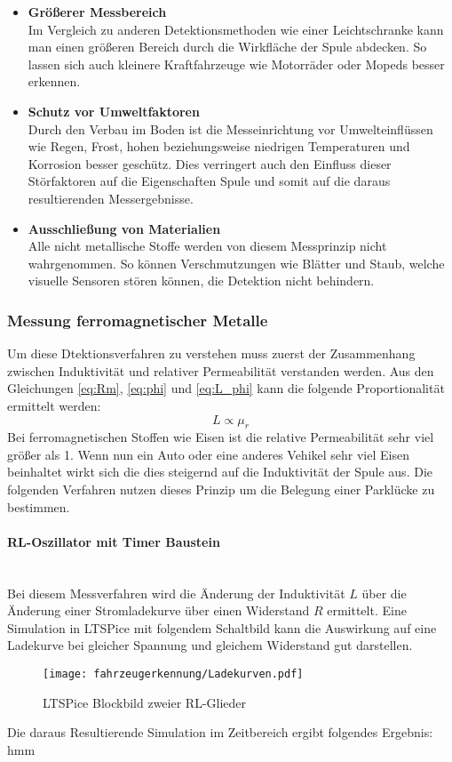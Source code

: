\begin{itemize}
    \item \textbf{Größerer Messbereich} \\
    Im Vergleich zu anderen Detektionsmethoden wie einer Leichtschranke kann man einen größeren Bereich durch die Wirkfläche
    der Spule abdecken. So lassen sich auch kleinere Kraftfahrzeuge wie Motorräder oder Mopeds besser erkennen.
    \item \textbf{Schutz vor Umweltfaktoren} \\
    Durch den Verbau im Boden ist die Messeinrichtung vor Umwelteinflüssen wie Regen, Frost, hohen beziehungsweise
    niedrigen Temperaturen und Korrosion besser geschütz. Dies verringert auch den Einfluss dieser Störfaktoren auf die Eigenschaften
    Spule und somit auf die daraus resultierenden Messergebnisse.
    \item \textbf{Ausschließung von Materialien} \\
    Alle nicht metallische Stoffe werden von diesem Messprinzip nicht wahrgenommen. So können Verschmutzungen wie Blätter und Staub, welche
    visuelle Sensoren stören können, die Detektion nicht behindern.
    
\end{itemize}
\subsubsection{Messung ferromagnetischer Metalle}
Um diese Dtektionsverfahren zu verstehen muss zuerst der Zusammenhang zwischen Induktivität und relativer Permeabilität verstanden werden.
Aus den Gleichungen \ref{eq:Rm}, \ref{eq:phi} und \ref{eq:L_phi} kann die folgende Proportionalität ermittelt werden:
\begin{equation} \label{iq:L_mu}
    L \propto \mu_{r}
\end{equation}
Bei ferromagnetischen Stoffen wie Eisen ist die relative Permeabilität sehr viel größer als 1. Wenn nun ein Auto oder 
eine anderes Vehikel sehr viel Eisen beinhaltet wirkt sich die dies steigernd auf die Induktivität der Spule aus. Die folgenden
Verfahren nutzen dieses Prinzip um die Belegung einer Parklücke zu bestimmen.

\paragraph{RL-Oszillator mit Timer Baustein}\mbox{}\\
Bei diesem Messverfahren wird die Änderung der Induktivität $L$ über die Änderung einer Stromladekurve über einen Widerstand
$R$ ermittelt. Eine Simulation in LTSPice mit folgendem Schaltbild kann die Auswirkung auf eine Ladekurve bei gleicher Spannung
und gleichem Widerstand gut darstellen.
\begin{figure}[H]
    \centering
    \texttt{[image: fahrzeugerkennung/Ladekurven.pdf]}
    \caption{LTSPice Blockbild zweier RL-Glieder}
\end{figure}
\pagebreak
Die daraus Resultierende Simulation im Zeitbereich ergibt folgendes Ergebnis:
hmm

